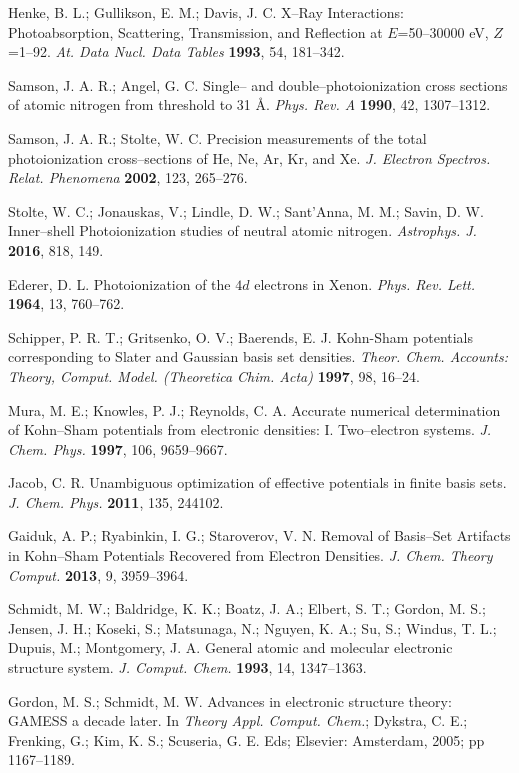 \documentclass[10pt]{article}
\begin{document}
\begin{thebibliography}{10}
Henke, B. L.; Gullikson, E. M.; Davis, J. C. 
X--Ray Interactions: Photoabsorption, Scattering, Transmission, and Reflection at $E$=50--30000 eV, $Z$=1--92.
{\it At. Data Nucl. Data Tables} {\bf 1993}, 54, 181--342.

Samson, J. A. R.; Angel, G. C.
Single-- and double--photoionization cross sections of atomic nitrogen from threshold to 31 \AA.
{\it Phys. Rev. A} {\bf 1990}, 42, 1307--1312.

Samson, J. A. R.; Stolte, W. C.
Precision measurements of the total photoionization cross--sections of He, Ne, Ar, Kr, and Xe.
{\it J. Electron Spectros. Relat. Phenomena} {\bf 2002}, 123, 265--276.

Stolte, W. C.; Jonauskas, V.; Lindle, D. W.; Sant'Anna, M. M.; Savin, D. W. 
Inner--shell Photoionization studies of neutral atomic nitrogen.
{\it Astrophys. J.} {\bf 2016}, 818, 149.

Ederer, D. L. 
Photoionization of the $4d$ electrons in Xenon.
{\it Phys. Rev. Lett.} {\bf 1964}, 13, 760--762.

Schipper, P. R. T.; Gritsenko, O. V.; Baerends, E. J. 
Kohn-Sham potentials corresponding to Slater and Gaussian basis set densities.
{\it Theor. Chem. Accounts: Theory, Comput. Model. (Theoretica Chim. Acta)} {\bf 1997}, 98, 16--24.

Mura, M. E.; Knowles, P. J.; Reynolds, C. A.
Accurate numerical determination of Kohn--Sham potentials from electronic densities: I. Two--electron systems.
{\it J. Chem. Phys.} {\bf 1997}, 106, 9659--9667.

Jacob, C. R. 
Unambiguous optimization of effective potentials in finite basis sets.
{\it J. Chem. Phys.} {\bf 2011}, 135, 244102.

Gaiduk, A. P.; Ryabinkin, I. G.; Staroverov, V. N.
Removal of Basis--Set Artifacts in Kohn--Sham Potentials Recovered from Electron Densities.
{\it J. Chem. Theory Comput.} {\bf 2013}, 9, 3959--3964.

Schmidt, M. W.; Baldridge, K. K.; Boatz, J. A.; Elbert, S. T.; Gordon, M. S.; Jensen, J. H.; Koseki, S.;
Matsunaga, N.; Nguyen, K. A.; Su, S.; Windus, T. L.; Dupuis, M.; Montgomery, J. A.
General atomic and molecular electronic structure system.
{\it J. Comput. Chem.} {\bf 1993}, 14, 1347--1363.

Gordon, M. S.; Schmidt, M. W.
Advances in electronic structure theory: GAMESS a decade later. 
In {\it Theory Appl. Comput. Chem.}; 
Dykstra, C. E.; Frenking, G.; Kim, K. S.; Scuseria, G. E. Eds;
Elsevier: Amsterdam, 2005; pp 1167--1189.


\end{thebibliography}
\end{document}
